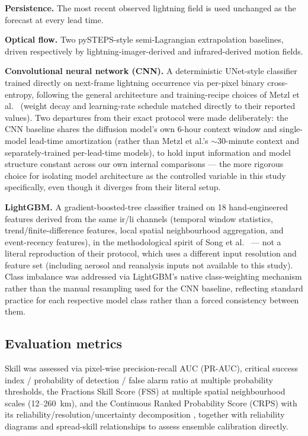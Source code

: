 \documentclass[pdflatex,sn-nature]{sn-jnl}%
\begin{document}
\textbf{Persistence.} The most recent observed lightning field is used
unchanged as the forecast at every lead time.

\textbf{Optical flow.} Two pySTEPS-style \citep{pulkkinen2019pysteps}
semi-Lagrangian extrapolation baselines, driven respectively by
lightning-imager-derived and infrared-derived motion fields.

\textbf{Convolutional neural network (CNN).} A deterministic UNet-style
classifier trained directly on next-frame lightning occurrence via
per-pixel binary cross-entropy, following the general architecture and
training-recipe choices of Metzl et al.\ \citep{metzl2025physical}
(weight decay and learning-rate schedule matched directly to their
reported values). Two departures from their exact protocol were made
deliberately: the CNN baseline shares the diffusion model's own 6-hour
context window and single-model lead-time amortization (rather than
Metzl et al.'s $\sim$30-minute context and separately-trained
per-lead-time models), to hold input information and model structure
constant across our own internal comparisons --- the more rigorous
choice for isolating model architecture as the controlled variable in
this study specifically, even though it diverges from their literal
setup.

\textbf{LightGBM.} A gradient-boosted-tree classifier
\citep{ke2017lightgbm} trained on 18 hand-engineered features derived
from the same ir/li channels (temporal window statistics,
trend/finite-difference features, local spatial neighbourhood
aggregation, and event-recency features), in the methodological spirit
of Song et al.\ \citep{song2023lightning} --- not a literal reproduction
of their protocol, which uses a different input resolution and feature
set (including aerosol and reanalysis inputs not available to this
study). Class imbalance was addressed via LightGBM's native
class-weighting mechanism rather than the manual resampling used for
the CNN baseline, reflecting standard practice for each respective
model class rather than a forced consistency between them.

\subsection*{Evaluation metrics}

Skill was assessed via pixel-wise precision-recall AUC (PR-AUC),
critical success index / probability of detection / false alarm ratio
at multiple probability thresholds, the Fractions Skill Score (FSS)
\citep{roberts2008fss} at multiple spatial neighbourhood scales
(12--260~km), and the Continuous Ranked Probability Score (CRPS) with
its reliability/resolution/uncertainty decomposition
\citep{gneiting2007scoring}, together with reliability diagrams and
spread-skill relationships to assess ensemble calibration directly.
\end{document}
